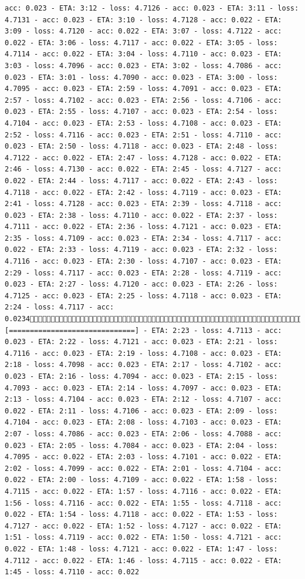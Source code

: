 \documentclass[11pt]{article}
\begin{document}
\begin{Verbatim}[commandchars=\\\{\}]
acc: 0.023 - ETA: 3:12 - loss: 4.7126 - acc: 0.023 - ETA: 3:11 - loss: 4.7131 - acc: 0.023 - ETA: 3:10 - loss: 4.7128 - acc: 0.022 - ETA: 3:09 - loss: 4.7120 - acc: 0.022 - ETA: 3:07 - loss: 4.7122 - acc: 0.022 - ETA: 3:06 - loss: 4.7117 - acc: 0.022 - ETA: 3:05 - loss: 4.7114 - acc: 0.022 - ETA: 3:04 - loss: 4.7110 - acc: 0.023 - ETA: 3:03 - loss: 4.7096 - acc: 0.023 - ETA: 3:02 - loss: 4.7086 - acc: 0.023 - ETA: 3:01 - loss: 4.7090 - acc: 0.023 - ETA: 3:00 - loss: 4.7095 - acc: 0.023 - ETA: 2:59 - loss: 4.7091 - acc: 0.023 - ETA: 2:57 - loss: 4.7102 - acc: 0.023 - ETA: 2:56 - loss: 4.7106 - acc: 0.023 - ETA: 2:55 - loss: 4.7107 - acc: 0.023 - ETA: 2:54 - loss: 4.7104 - acc: 0.023 - ETA: 2:53 - loss: 4.7108 - acc: 0.023 - ETA: 2:52 - loss: 4.7116 - acc: 0.023 - ETA: 2:51 - loss: 4.7110 - acc: 0.023 - ETA: 2:50 - loss: 4.7118 - acc: 0.023 - ETA: 2:48 - loss: 4.7122 - acc: 0.022 - ETA: 2:47 - loss: 4.7128 - acc: 0.022 - ETA: 2:46 - loss: 4.7130 - acc: 0.022 - ETA: 2:45 - loss: 4.7127 - acc: 0.022 - ETA: 2:44 - loss: 4.7117 - acc: 0.022 - ETA: 2:43 - loss: 4.7118 - acc: 0.022 - ETA: 2:42 - loss: 4.7119 - acc: 0.023 - ETA: 2:41 - loss: 4.7128 - acc: 0.023 - ETA: 2:39 - loss: 4.7118 - acc: 0.023 - ETA: 2:38 - loss: 4.7110 - acc: 0.022 - ETA: 2:37 - loss: 4.7111 - acc: 0.022 - ETA: 2:36 - loss: 4.7121 - acc: 0.023 - ETA: 2:35 - loss: 4.7109 - acc: 0.023 - ETA: 2:34 - loss: 4.7117 - acc: 0.022 - ETA: 2:33 - loss: 4.7119 - acc: 0.023 - ETA: 2:32 - loss: 4.7116 - acc: 0.023 - ETA: 2:30 - loss: 4.7107 - acc: 0.023 - ETA: 2:29 - loss: 4.7117 - acc: 0.023 - ETA: 2:28 - loss: 4.7119 - acc: 0.023 - ETA: 2:27 - loss: 4.7120 - acc: 0.023 - ETA: 2:26 - loss: 4.7125 - acc: 0.023 - ETA: 2:25 - loss: 4.7118 - acc: 0.023 - ETA: 2:24 - loss: 4.7117 - acc: 0.02346680/6680 [==============================] - ETA: 2:23 - loss: 4.7113 - acc: 0.023 - ETA: 2:22 - loss: 4.7121 - acc: 0.023 - ETA: 2:21 - loss: 4.7116 - acc: 0.023 - ETA: 2:19 - loss: 4.7108 - acc: 0.023 - ETA: 2:18 - loss: 4.7098 - acc: 0.023 - ETA: 2:17 - loss: 4.7102 - acc: 0.023 - ETA: 2:16 - loss: 4.7094 - acc: 0.023 - ETA: 2:15 - loss: 4.7093 - acc: 0.023 - ETA: 2:14 - loss: 4.7097 - acc: 0.023 - ETA: 2:13 - loss: 4.7104 - acc: 0.023 - ETA: 2:12 - loss: 4.7107 - acc: 0.022 - ETA: 2:11 - loss: 4.7106 - acc: 0.023 - ETA: 2:09 - loss: 4.7104 - acc: 0.023 - ETA: 2:08 - loss: 4.7103 - acc: 0.023 - ETA: 2:07 - loss: 4.7086 - acc: 0.023 - ETA: 2:06 - loss: 4.7088 - acc: 0.023 - ETA: 2:05 - loss: 4.7084 - acc: 0.023 - ETA: 2:04 - loss: 4.7095 - acc: 0.022 - ETA: 2:03 - loss: 4.7101 - acc: 0.022 - ETA: 2:02 - loss: 4.7099 - acc: 0.022 - ETA: 2:01 - loss: 4.7104 - acc: 0.022 - ETA: 2:00 - loss: 4.7109 - acc: 0.022 - ETA: 1:58 - loss: 4.7115 - acc: 0.022 - ETA: 1:57 - loss: 4.7116 - acc: 0.022 - ETA: 1:56 - loss: 4.7116 - acc: 0.022 - ETA: 1:55 - loss: 4.7118 - acc: 0.022 - ETA: 1:54 - loss: 4.7118 - acc: 0.022 - ETA: 1:53 - loss: 4.7127 - acc: 0.022 - ETA: 1:52 - loss: 4.7127 - acc: 0.022 - ETA: 1:51 - loss: 4.7119 - acc: 0.022 - ETA: 1:50 - loss: 4.7121 - acc: 0.022 - ETA: 1:48 - loss: 4.7121 - acc: 0.022 - ETA: 1:47 - loss: 4.7112 - acc: 0.022 - ETA: 1:46 - loss: 4.7115 - acc: 0.022 - ETA: 1:45 - loss: 4.7110 - acc: 0.022 
\end{Verbatim}
\end{document}
